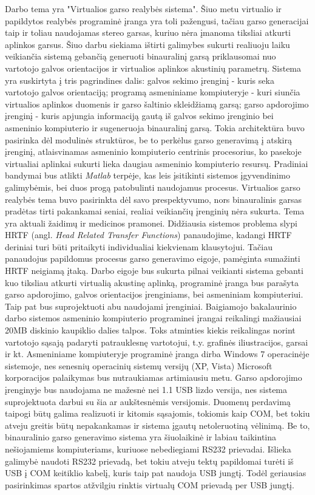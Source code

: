 \documentclass[]{vgtuef}
\begin{document}
Darbo tema yra "Virtualios garso realybės sistema". Šiuo metu virtualio ir papildytos realybės programinė įranga yra toli pažengusi, tačiau garso generacijai taip ir toliau naudojamas stereo garsas, kuriuo nėra įmanoma tiksliai atkurti aplinkos garsus.
Šiuo darbu siekiama ištirti galimybes sukurti realiuoju laiku veikiančia sistemą gebančią generuoti binauralinį garsą priklausomai nuo vartotojo galvos orientacijos ir virtualios aplinkos akustinių parametrų. Sistema yra suskirtyta į tris pagrindines dalis: galvos sekimo įrenginį - kuris seka vartotojo galvos orientaciją; programą asmeniniame kompiuteryje - kuri siunčia virtualios aplinkos duomenis ir garso šaltinio skleidžiamą garsą; garso apdorojimo įrenginį - kuris apjungia informaciją gautą iš galvos sekimo įrenginio bei asmeninio kompiuterio ir sugeneruoja binauralinį garsą. Tokia architektūra buvo pasirinka dėl modulinės struktūros, be to perkėlus garso generavimą į atskirą įrenginį, atlaisvinamas asmeninio kompiuterio centrinis procesorius, ko pasekoje virtualiai aplinkai sukurti lieka daugiau asmeninio kompiuterio resursų.
Pradiniai bandymai bus atlikti \textit{Matlab} terpėje, kas leis įsitikinti sistemos įgyvendinimo galimybėmis, bei duos progą patobulinti naudojamus procesus.
Virtualios garso realybės tema buvo pasirinkta dėl savo prespektyvumo, nors binauralinis garsas pradėtas tirti pakankamai seniai, realiai veikiančių įrenginių nėra sukurta. Tema yra aktuali žaidimų ir medicinos pramonei.
Didžiausia sistemos problema slypi HRTF (angl. \textit{Head Related Transfer Functions}) panaudojime, kadangi HRTF deriniai turi būti pritaikyti individualiai kiekvienam klausytojui. Tačiau panaudojus papildomus procesus garso generavimo eigoje, pamėginta sumažinti HRTF neigiamą įtaką.
Darbo eigoje bus sukurta pilnai veikianti sistema gebanti kuo tiksliau atkurti virtualią akustinę aplinką, programinė įranga bus parašyta garso apdorojimo, galvos orientacijos įrenginiams, bei asmeniniam kompiuteriui. Taip pat bus suprojektuoti abu naudojami įrenginiai.
Baigiamojo bakalaurinio darbo sistemos asmeninio kompiuterio programinei įrangai reikalingi mažiausiai 20MB diskinio kaupiklio dalies talpos. Toks atminties kiekis reikalingas norint vartotojo sąsają padaryti patrauklesnę vartotojui, t.y. grafinės iliustracijos, garsai ir kt. Asmeniniame kompiuteryje programinė įranga dirba Windows 7 operacinėje sistemoje, nes senesnių operacinių sistemų versijų (XP, Vista) Microsoft korporacijos palaikymas bus nutraukiamas artimiausiu metu.
Garso apdorojimo įrenginyje bus naudojama ne mažesnė nei 1.1 USB lizdo versija, nes sistema suprojektuota darbui su šia ar aukštesnėmis versijomis. Duomenų perdavimą taipogi būtų galima realizuoti ir kitomis sąsajomis, tokiomis kaip COM, bet tokiu atveju greitis būtų nepakankamas ir sistema įgautų netoleruotiną vėlinimą. Be to, binauralinio garso generavimo sistema yra šiuolaikinė ir labiau taikintina nešiojamiems kompiuteriams, kuriuose nebediegiami RS232 prievadai. Išlieka galimybė naudoti RS232 prievadą, bet tokiu atveju tektų papildomai turėti iš USB į COM keitiklio kabelį, kuris taip pat naudoja USB jungtį. Todėl geriausias pasirinkimas spartos atžvilgiu rinktis virtualų COM  prievadą per USB jungtį.
\end{document}
